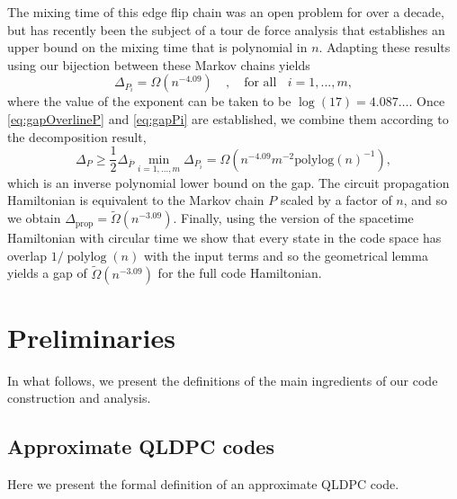 \documentclass[11pt,letterpaper]{article}
\theoremstyle{definition}
\theoremstyle{remark}
\DeclareMathOperator{\polylog}{polylog}
\renewcommand{\geq}{\geqslant}
\numberwithin{equation}{section}
\theoremstyle{definition}
\newcommand{\wt}[1]{\widetilde{#1}}
\begin{document}
The mixing time of this edge flip chain was an open problem for over a decade, but has recently been the subject of a tour de force analysis that establishes an upper bound on the mixing time that is polynomial in $n$.   Adapting these results using our bijection between these Markov chains yields
\begin{equation}
\Delta_{P_i} = \Omega\left(n^{-4.09} \right) \quad ,\quad \textrm{for all } \; \; i=1,...,m, \label{eq:gapPi}
\end{equation}
where the value of the exponent can be taken to be $\log (17) = 4.087\ldots$.
Once \eqref{eq:gapOverlineP} and \eqref{eq:gapPi} are established, we combine them according to the decomposition result,
$$
\Delta_P \geq \frac{1}{2} \Delta_{\overline{P}} \min_{i = 1,...,m} \Delta_{P_i} = \Omega\left(n^{-4.09} m^{-2} \textrm{polylog}(n)^{-1}\right),
$$
which is an inverse polynomial lower bound on the gap.  The circuit propagation Hamiltonian is equivalent to the Markov chain $P$ scaled by a factor of $n$, and so we obtain $\Delta_{\textrm{prop}} = \wt{\Omega}(n^{-3.09})$.  Finally, using the version of the spacetime Hamiltonian with circular time we show that every state in the code space has overlap $1/\polylog(n)$ with the input terms and so the geometrical lemma yields a gap of $\wt{\Omega}(n^{-3.09})$ for the full code Hamiltonian.

%
%

%

%

\section{Preliminaries}
\label{sec:prelim}

In what follows, we present the definitions of the main ingredients of our code construction and analysis.

\subsection{Approximate QLDPC codes}

\newcommand{\Enc}{\mathrm{Enc}}
\newcommand{\Rec}{\mathrm{Rec}}

Here we present the formal definition of an approximate QLDPC code.
\end{document}
